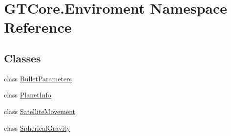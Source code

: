 \hypertarget{namespace_g_t_core_1_1_enviroment}{}\section{G\+T\+Core.\+Enviroment Namespace Reference}
\label{namespace_g_t_core_1_1_enviroment}
\subsection*{Classes}
\begin{DoxyCompactItemize}
\item 
class \hyperlink{class_g_t_core_1_1_enviroment_1_1_bullet_parameters}{Bullet\+Parameters}
\item 
class \hyperlink{class_g_t_core_1_1_enviroment_1_1_planet_info}{Planet\+Info}
\item 
class \hyperlink{class_g_t_core_1_1_enviroment_1_1_satellite_movement}{Satellite\+Movement}
\item 
class \hyperlink{class_g_t_core_1_1_enviroment_1_1_spherical_gravity}{Spherical\+Gravity}
\end{DoxyCompactItemize}
